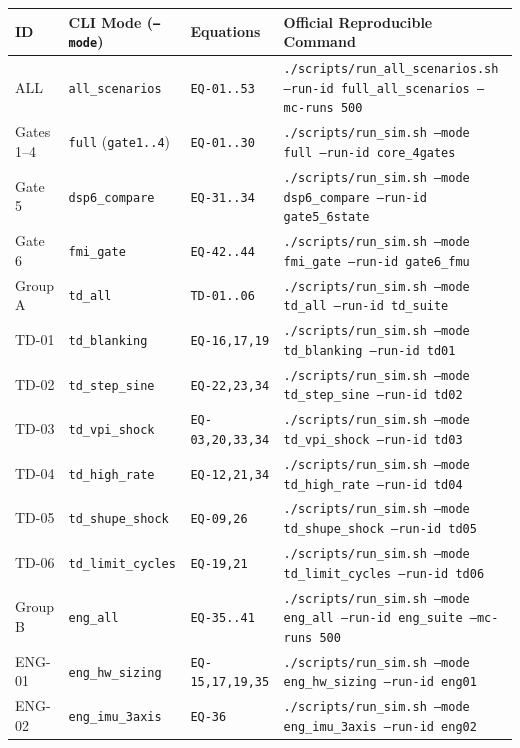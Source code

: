 \documentclass[11pt,a4paper]{article}
\begin{document}
\scriptsize
\begin{tabularx}{\textwidth}{@{}l l l X@{}}
\toprule
\textbf{ID} & \textbf{CLI Mode (\texttt{--mode})} & \textbf{Equations} & \textbf{Official Reproducible Command} \\
\midrule
ALL & \texttt{all\_scenarios} & \texttt{EQ-01..53} & \texttt{./scripts/run\_all\_scenarios.sh --run-id full\_all\_scenarios --mc-runs 500} \\
Gates 1--4 & \texttt{full} (\texttt{gate1..4}) & \texttt{EQ-01..30} & \texttt{./scripts/run\_sim.sh --mode full --run-id core\_4gates} \\
Gate 5 & \texttt{dsp6\_compare} & \texttt{EQ-31..34} & \texttt{./scripts/run\_sim.sh --mode dsp6\_compare --run-id gate5\_6state} \\
Gate 6 & \texttt{fmi\_gate} & \texttt{EQ-42..44} & \texttt{./scripts/run\_sim.sh --mode fmi\_gate --run-id gate6\_fmu} \\
Group A & \texttt{td\_all} & \texttt{TD-01..06} & \texttt{./scripts/run\_sim.sh --mode td\_all --run-id td\_suite} \\
TD-01 & \texttt{td\_blanking} & \texttt{EQ-16,17,19} & \texttt{./scripts/run\_sim.sh --mode td\_blanking --run-id td01} \\
TD-02 & \texttt{td\_step\_sine} & \texttt{EQ-22,23,34} & \texttt{./scripts/run\_sim.sh --mode td\_step\_sine --run-id td02} \\
TD-03 & \texttt{td\_vpi\_shock} & \texttt{EQ-03,20,33,34} & \texttt{./scripts/run\_sim.sh --mode td\_vpi\_shock --run-id td03} \\
TD-04 & \texttt{td\_high\_rate} & \texttt{EQ-12,21,34} & \texttt{./scripts/run\_sim.sh --mode td\_high\_rate --run-id td04} \\
TD-05 & \texttt{td\_shupe\_shock} & \texttt{EQ-09,26} & \texttt{./scripts/run\_sim.sh --mode td\_shupe\_shock --run-id td05} \\
TD-06 & \texttt{td\_limit\_cycles} & \texttt{EQ-19,21} & \texttt{./scripts/run\_sim.sh --mode td\_limit\_cycles --run-id td06} \\
Group B & \texttt{eng\_all} & \texttt{EQ-35..41} & \texttt{./scripts/run\_sim.sh --mode eng\_all --run-id eng\_suite --mc-runs 500} \\
ENG-01 & \texttt{eng\_hw\_sizing} & \texttt{EQ-15,17,19,35} & \texttt{./scripts/run\_sim.sh --mode eng\_hw\_sizing --run-id eng01} \\
ENG-02 & \texttt{eng\_imu\_3axis} & \texttt{EQ-36} & \texttt{./scripts/run\_sim.sh --mode eng\_imu\_3axis --run-id eng02} \\

\end{tabularx}
\end{document}
